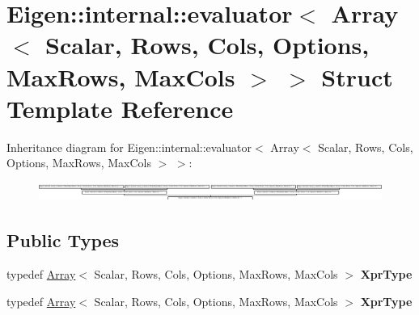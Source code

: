 \hypertarget{struct_eigen_1_1internal_1_1evaluator_3_01_array_3_01_scalar_00_01_rows_00_01_cols_00_01_options211222ab89c0f0e9e4e97c28137aec40}{}\section{Eigen\+:\+:internal\+:\+:evaluator$<$ Array$<$ Scalar, Rows, Cols, Options, Max\+Rows, Max\+Cols $>$ $>$ Struct Template Reference}
\label{struct_eigen_1_1internal_1_1evaluator_3_01_array_3_01_scalar_00_01_rows_00_01_cols_00_01_options211222ab89c0f0e9e4e97c28137aec40}
Inheritance diagram for Eigen\+:\+:internal\+:\+:evaluator$<$ Array$<$ Scalar, Rows, Cols, Options, Max\+Rows, Max\+Cols $>$ $>$\+:\begin{figure}[H]
\begin{center}
\leavevmode
\includegraphics[height=0.617647cm]{struct_eigen_1_1internal_1_1evaluator_3_01_array_3_01_scalar_00_01_rows_00_01_cols_00_01_options211222ab89c0f0e9e4e97c28137aec40}
\end{center}
\end{figure}
\subsection*{Public Types}
\begin{DoxyCompactItemize}
\item 
\mbox{\label{struct_eigen_1_1internal_1_1evaluator_3_01_array_3_01_scalar_00_01_rows_00_01_cols_00_01_options211222ab89c0f0e9e4e97c28137aec40_a8c05424c2b21ad594be7765087e95d82}} 
typedef \hyperlink{group___core___module_class_eigen_1_1_array}{Array}$<$ Scalar, Rows, Cols, Options, Max\+Rows, Max\+Cols $>$ {\bfseries Xpr\+Type}
\item 
\mbox{\label{struct_eigen_1_1internal_1_1evaluator_3_01_array_3_01_scalar_00_01_rows_00_01_cols_00_01_options211222ab89c0f0e9e4e97c28137aec40_a8c05424c2b21ad594be7765087e95d82}} 
typedef \hyperlink{group___core___module_class_eigen_1_1_array}{Array}$<$ Scalar, Rows, Cols, Options, Max\+Rows, Max\+Cols $>$ {\bfseries Xpr\+Type}
\end{DoxyCompactItemize}
